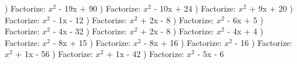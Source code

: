 \documentclass{article}%
\begin{document}
) Factorize: $x^2$ - 19x + 90%
\newline%
\newline%
) Factorize: $x^2$ - 10x + 24%
\newline%
\newline%
) Factorize: $x^2$ + 9x + 20%
\newline%
\newline%
) Factorize: $x^2$ - 1x - 12%
\newline%
\newline%
) Factorize: $x^2$ + 2x - 8%
\newline%
\newline%
) Factorize: $x^2$ - 6x + 5%
\newline%
\newline%
) Factorize: $x^2$ - 4x - 32%
\newline%
\newline%
) Factorize: $x^2$ + 2x - 8%
\newline%
\newline%
) Factorize: $x^2$ - 4x + 4%
\newline%
\newline%
) Factorize: $x^2$ - 8x + 15%
\newline%
\newline%
) Factorize: $x^2$ - 8x + 16%
\newline%
\newline%
) Factorize: $x^2$ - 16%
\newline%
\newline%
) Factorize: $x^2$ + 1x - 56%
\newline%
\newline%
) Factorize: $x^2$ + 1x - 42%
\newline%
\newline%
) Factorize: $x^2$ - 5x - 6%
\end{document}
